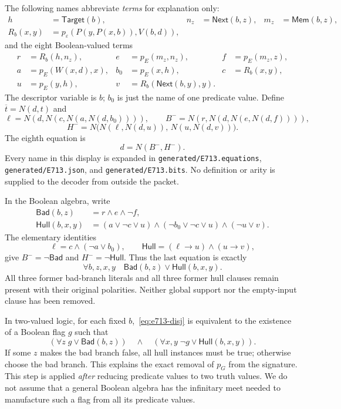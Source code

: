 The following names abbreviate \emph{terms} for explanation only:
\begin{align*}
 h&=\mathsf{Target}(b),& n_z&=\mathsf{Next}(b,z),&m_z&=\mathsf{Mem}(b,z),\\
 R_b(x,y)&=p_\varepsilon(P(y,P(x,b)),V(b,d)),&&&
\end{align*}
and the eight Boolean-valued terms
\begin{align*}
 r&=R_b(h,n_z),&e&=p_E(m_z,n_z),&f&=p_E(m_z,z),\\
 a&=p_E(W(x,d),x),&b_0&=p_E(x,h),&c&=R_b(x,y),\\
 u&=p_E(y,h),&v&=R_b(\mathsf{Next}(b,y),y).&&
\end{align*}
The descriptor variable is $b$; $b_0$ is just the name of one predicate
value. Define $\overline t=N(d,t)$ and
\[
 \ell=N(d,N(c,N(a,N(d,b_0)))),\qquad
 B^-=N(r,N(d,N(e,N(d,f)))),
\]
\[
 H^-=N\bigl(N(\ell,N(d,u)),\,N(u,N(d,v))\bigr).
\]
The eighth equation is
\begin{equation}
                       d=N(B^-,H^-).\label{eq:e713-closure}
\end{equation}
Every name in this display is expanded in
\texttt{generated/E713.equations}, \texttt{generated/E713.json}, and
\texttt{generated/E713.bits}. No definition or arity is supplied to the
decoder from outside the packet.

In the Boolean algebra, write
\begin{align*}
 \mathsf{Bad}(b,z)&=r\land e\land\neg f,\\
 \mathsf{Hull}(b,x,y)&=(a\lor\neg c\lor u)
       \land(\neg b_0\lor\neg c\lor u)
       \land(\neg u\lor v).
\end{align*}
The elementary identities
\[
 \ell=c\land(\neg a\lor b_0),\qquad
 \mathsf{Hull}=(\ell\to u)\land(u\to v),
\]
give $B^-=\neg\mathsf{Bad}$ and $H^-=\neg\mathsf{Hull}$. Thus the
last equation is exactly
\begin{equation}
 \forall b,z,x,y\quad
       \mathsf{Bad}(b,z)\lor\mathsf{Hull}(b,x,y).\label{eq:e713-disj}
\end{equation}
All three former bad-branch literals and all three former hull clauses
remain present with their original polarities. Neither global support nor
the empty-input clause has been removed.

In two-valued logic, for each fixed $b$,~\eqref{eq:e713-disj} is equivalent
to the existence of a Boolean flag $g$ such that
\[
  (\forall z\;g\lor\mathsf{Bad}(b,z))
  \quad\land\quad
  (\forall x,y\;\neg g\lor\mathsf{Hull}(b,x,y)).
\]
If some $z$ makes the bad branch false, all hull instances must be true;
otherwise choose the bad branch. This explains the exact removal of
$p_G$ from the signature. This step is applied \emph{after} reducing
predicate values to two truth values. We do not assume that a general
Boolean algebra has the infinitary meet needed to manufacture such a
flag from all its predicate values.


